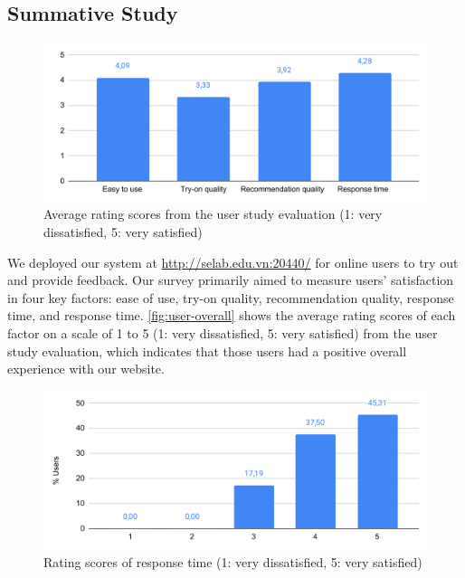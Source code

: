 

\subsection{Summative Study}
\label{app-exp-summative-study}
\begin{figure}[h!]
  \centering
  \includegraphics[width=0.8\linewidth]{content/resources/images/application/exp-user-overall.pdf}
  \caption{Average rating scores from the user study evaluation (1: very dissatisfied, 5: very satisfied)}
  \label{fig:user-overall}
\end{figure}

We deployed our system at \url{http://selab.edu.vn:20440/} for online users to try out and provide feedback. Our survey primarily aimed to measure users' satisfaction in four key factors: ease of use, try-on quality, recommendation quality, response time, and response time. \autoref{fig:user-overall} shows the average rating scores of each factor on a scale of 1 to 5 (1: very dissatisfied, 5: very satisfied) from the user study evaluation, which indicates that those users had a positive overall experience with our website.

\begin{figure}[h!]
  \centering
  \includegraphics[width=0.8\linewidth]{content/resources/images/application/exp-user-response-time.pdf}
  \caption{Rating scores of response time (1: very dissatisfied, 5: very satisfied)}
  \label{fig:response-time}
\end{figure}

